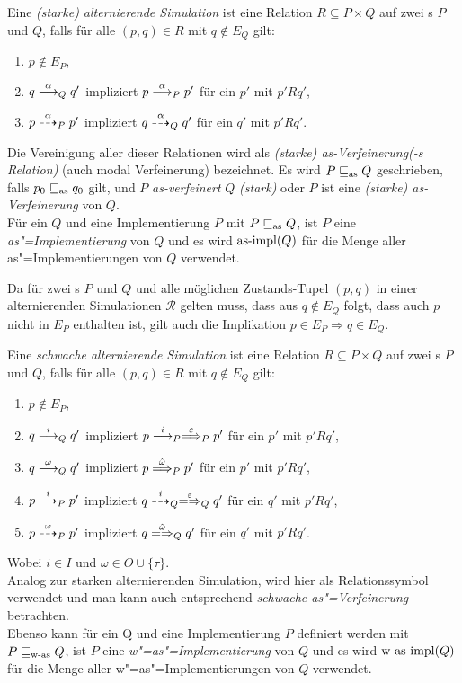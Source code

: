 \begin{Def}
  \label{SimDef}
  Eine \emph{(starke) alternierende Simulation} ist eine Relation $R\subseteq P
  \times Q$ auf zwei \MEIO{}s $P$ und $Q$, falls für alle $(p,q)\in R$ mit
  $q\notin E_Q$ gilt:
  \begin{enumerate}
    \item $p\notin E_P$,
    \item $q\must[\alpha]_Q q'$ impliziert $p\must[\alpha]_P p'$ für ein $p'$
      mit $p'Rq'$,
    \item $p\may[\alpha]_P p'$ impliziert $q\may[\alpha]_Q q'$ für ein $q'$ mit
      $p'Rq'$.
  \end{enumerate}
  Die Vereinigung \asRel{} aller dieser Relationen wird als \emph{(starke)
  as-Verfeinerung(-s Relation)} (auch modal Verfeinerung) bezeichnet. Es wird
  $P\sqsubseteq _{\mathrm{as}} Q$ geschrieben, falls $p_0\sqsubseteq _{\mathrm{as}} q_0$ gilt, und $P$
  \emph{as-verfeinert} $Q$ \emph{(stark)} oder $P$ ist eine \emph{(starke)
  as-Verfeinerung} von $Q$.\\
  Für ein \MEIO{} $Q$ und eine Implementierung $P$ mit $P\sqsubseteq _{\mathrm{as}}{}Q$, ist
  $P$ eine \emph{as"=Implementierung} von $Q$ und es wird $\mathrm{as}\text{-}\mathrm{impl} (Q)$ für die
  Menge aller as"=Implementierungen von $Q$ verwendet.
\end{Def}

Da für zwei \MEIO{}s $P$ und $Q$ und alle möglichen Zustands-Tupel $(p,q)$ in
einer alternierenden Simulationen $\mathcal{R}$ gelten muss, dass aus $q\notin
E_Q$ folgt, dass auch $p$ nicht in $E_P$ enthalten ist, gilt auch die
Implikation $p\in E_P\Rightarrow q\in E_Q$.

\begin{Def}
  \label{wSimDef}
  Eine \emph{schwache alternierende Simulation} ist eine Relation $R\subseteq P
  \times Q$ auf zwei \MEIO{}s $P$ und $Q$, falls für alle $(p,q)\in R$ mit
  $q\notin E_Q$ gilt:
  \begin{enumerate}
    \item $p\notin E_P$,
    \item $q\must[i]_Q q'$ impliziert $p\must[i]_P\weakmust[\varepsilon]_P p'$
      für ein $p'$ mit $p'Rq'$,
    \item $q\must[\omega]_Q q'$ impliziert $p\weakmust[\hat{\omega}]_P p'$ für
      ein $p'$ mit $p'Rq'$,
    \item $p\may[i]_P p'$ impliziert $q\may[i]_Q\weakmay[\varepsilon]_Q q'$ für
      ein $q'$ mit $p'Rq'$,
    \item $p\may[\omega]_P p'$ impliziert $q\weakmay[\hat{\omega}]_Q q'$ für
      ein $q'$ mit $p'Rq'$.
  \end{enumerate}
  Wobei $i\in I$ und $\omega\in O\cup\{\tau\}$.\\
  Analog zur starken alternierenden Simulation, wird hier \wasRel{} als
  Relationssymbol verwendet und man kann auch entsprechend \emph{schwache
  as"=Verfeinerung} betrachten.\\
  Ebenso kann \wasRel{} für ein \MEIO{} Q und eine Implementierung $P$
  definiert werden mit $P\sqsubseteq _{\mathrm{w}\text{-}\mathrm{as}} Q$, ist $P$ eine \emph{w"=as"=Implementierung}
  von $Q$ und es wird $\mathrm{w}\text{-}\mathrm{as}\text{-}\mathrm{impl} (Q)$ für die Menge aller
  w"=as"=Implementierungen von $Q$ verwendet.
\end{Def}

